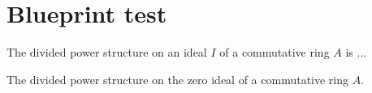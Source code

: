 %

\chapter{Blueprint test}

\begin{definition}
	\label{def:divided_powers}
	\leanok
	The divided power structure on an ideal $I$ of a commutative ring $A$ is ...
\end{definition}

\begin{definition}
	\label{def:divided_powers_bot}
	\leanok
	The divided power structure on the zero ideal of a commutative ring $A$.
\end{definition}